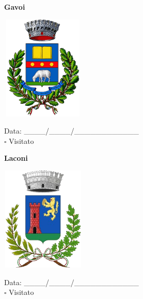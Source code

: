 \documentclass[a5paper,12pt]{article}
\begin{document}
\noindent
\begin{minipage}[t]{0.45\textwidth}
    \begin{center}
        \textbf{Gavoi}
    \end{center}
    \vspace{-0.4cm} %
    \begin{center}
        \includegraphics[height= 5cm, width=4cm]{Sardegna/Stemma Gavoi.png}
    \end{center}
    \vspace{-0.5cm} %
    \begin{flushleft}
        Data: \_\_\_\_/\_\_\_\_/\_\_\_\_\_\_\_\_\_\_\_\_ \\
        $\square$ Visitato
    \end{flushleft}
\end{minipage}
\hfill
\noindent
\begin{minipage}[t]{0.45\textwidth}
    \begin{center}
        \textbf{Laconi}
    \end{center}
    \vspace{-0.4cm} %
    \begin{center}
        \includegraphics[height= 5cm, width=4cm]{Sardegna/Stemma Laconi.png}
    \end{center}
    \vspace{-0.5cm} %
    \begin{flushleft}
        Data: \_\_\_\_/\_\_\_\_/\_\_\_\_\_\_\_\_\_\_\_\_ \\
        $\square$ Visitato
    \end{flushleft}
\end{minipage}
\end{document}
